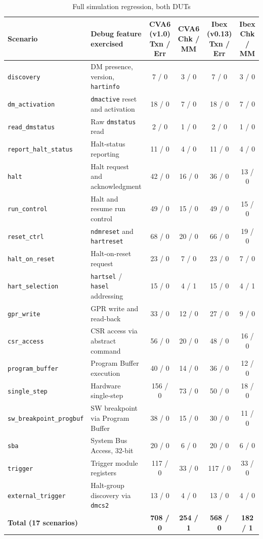 \documentclass[conference]{IEEEtran}
\begin{document}
\begin{table}[!t]
\caption{Full simulation regression, both DUTs}
\label{tab:II}
\centering
\footnotesize
\begin{tabular}{lp{}cccc}
\toprule
Scenario & Debug feature exercised & CVA6 (v1.0) Txn / Err & CVA6 Chk / MM & Ibex (v0.13) Txn / Err & Ibex Chk / MM \\
\midrule
\texttt{discovery} & DM presence, version, \texttt{hartinfo} & 7 / 0 & 3 / 0 & 7 / 0 & 3 / 0 \\
\texttt{dm\_activation} & \texttt{dmactive} reset and activation & 18 / 0 & 7 / 0 & 18 / 0 & 7 / 0 \\
\texttt{read\_dmstatus} & Raw \texttt{dmstatus} read & 2 / 0 & 1 / 0 & 2 / 0 & 1 / 0 \\
\texttt{report\_halt\_status} & Halt-status reporting & 11 / 0 & 4 / 0 & 11 / 0 & 4 / 0 \\
\texttt{halt} & Halt request and acknowledgment & 42 / 0 & 16 / 0 & 36 / 0 & 13 / 0 \\
\texttt{run\_control} & Halt and resume run control & 49 / 0 & 15 / 0 & 49 / 0 & 15 / 0 \\
\texttt{reset\_ctrl} & \texttt{ndmreset} and \texttt{hartreset} & 68 / 0 & 20 / 0 & 66 / 0 & 19 / 0 \\
\texttt{halt\_on\_reset} & Halt-on-reset request & 23 / 0 & 7 / 0 & 23 / 0 & 7 / 0 \\
\texttt{hart\_selection} & \texttt{hartsel} / \texttt{hasel} addressing & 15 / 0 & 4 / 1 & 15 / 0 & 4 / 1 \\
\texttt{gpr\_write} & GPR write and read-back & 33 / 0 & 12 / 0 & 27 / 0 & 9 / 0 \\
\texttt{csr\_access} & CSR access via abstract command & 56 / 0 & 20 / 0 & 48 / 0 & 16 / 0 \\
\texttt{program\_buffer} & Program Buffer execution & 40 / 0 & 14 / 0 & 36 / 0 & 12 / 0 \\
\texttt{single\_step} & Hardware single-step & 156 / 0 & 73 / 0 & 50 / 0 & 18 / 0 \\
\texttt{sw\_breakpoint\_progbuf} & SW breakpoint via Program Buffer & 38 / 0 & 15 / 0 & 30 / 0 & 11 / 0 \\
\texttt{sba} & System Bus Access, 32-bit & 20 / 0 & 6 / 0 & 20 / 0 & 6 / 0 \\
\texttt{trigger} & Trigger module registers & 117 / 0 & 33 / 0 & 117 / 0 & 33 / 0 \\
\texttt{external\_trigger} & Halt-group discovery via \texttt{dmcs2} & 13 / 0 & 4 / 0 & 13 / 0 & 4 / 0 \\
\textbf{Total (17 scenarios)} &  & \textbf{708 / 0} & \textbf{254 / 1} & \textbf{568 / 0} & \textbf{182 / 1} \\
\bottomrule
\end{tabular}
\end{table}
\end{document}
